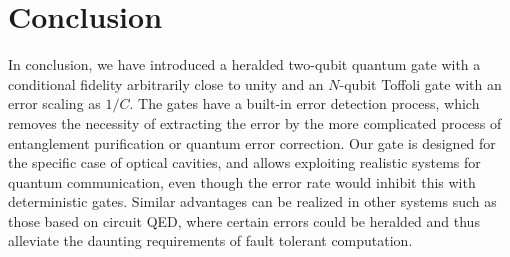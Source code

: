 \section{Conclusion}

In conclusion, we have introduced a heralded two-qubit quantum
gate with a conditional fidelity arbitrarily close to unity and an $N$-qubit Toffoli gate
with an error scaling as $1/C$. The gates have a
built-in error detection process, which removes the necessity of extracting the
error by the more complicated process of entanglement purification or quantum
error correction. Our gate is designed for the specific case of optical
cavities, and allows exploiting realistic systems for quantum communication, even though the error rate would inhibit this with deterministic gates. Similar
advantages can be realized in other systems such as those based on circuit QED,
where certain errors could be heralded and thus alleviate the daunting requirements of fault tolerant
computation. 
